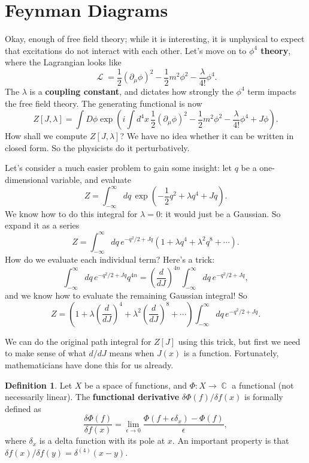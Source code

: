 \documentclass{report}
\theoremstyle{plain}
\theoremstyle{definition}
\newtheorem{definition}[theorem]{Definition}
\theoremstyle{remark}
\DeclareMathOperator{\bC}{\mathbb{C}}
\DeclareMathOperator{\cL}{\mathcal{L}}
\begin{document}
\section{Feynman Diagrams}

Okay, enough of free field theory; while it is interesting, it is
unphysical to expect that excitations do not interact with each other.
Let's move on to {\bf $\phi^4$ theory}, where the Lagrangian looks like
$$ \cL = \frac{1}{2} (\partial_\mu \phi)^2 - \frac{1}{2} m^2\phi^2 - \frac{\lambda}{4!} \phi^4. $$
The $\lambda$ is a {\bf coupling constant}, and dictates how strongly
the $\phi^4$ term impacts the free field theory. The generating
functional is now
$$ Z[J, \lambda] = \int D\phi \exp\left(i \int d^4x \, \frac{1}{2} (\partial_\mu \phi)^2 - \frac{1}{2}m^2\phi^2 - \frac{\lambda}{4!}\phi^4 + J\phi\right). $$
How shall we compute $Z[J, \lambda]$? We have no idea whether it can
be written in closed form. So the physicists do it perturbatively.

Let's consider a much easier problem to gain some insight: let $q$ be
a one-dimensional variable, and evaluate
$$ Z = \int_{-\infty}^\infty dq \, \exp\left(-\frac{1}{2} q^2 + \lambda q^4 + Jq\right). $$
We know how to do this integral for $\lambda = 0$: it would just be a
Gaussian. So expand it as a series
$$ Z = \int_{-\infty}^\infty dq \, e^{-q^2/2 + Jq} \left(1 + \lambda q^4 + \lambda^2 q^8 + \cdots\right). $$
How do we evaluate each individual term? Here's a trick:
$$ \int_{-\infty}^\infty dq \, e^{-q^2/2 + Jq} q^{4n} = \left(\frac{d}{dJ}\right)^{4n} \int_{-\infty}^\infty dq \, e^{-q^2/2 + Jq}, $$
and we know how to evaluate the remaining Gaussian integral! So
$$ Z = \left(1 + \lambda \left(\frac{d}{dJ}\right)^4 + \lambda^2 \left(\frac{d}{dJ}\right)^8 + \cdots\right) \int_{-\infty}^\infty dq \, e^{-q^2/2 + Jq}. $$

We can do the original path integral for $Z[J]$ using this trick, but
first we need to make sense of what $d/dJ$ means when $J(x)$ is a
function. Fortunately, mathematicians have done this for us already.

\begin{definition}
  Let $X$ be a space of functions, and $\Phi: X \to \bC$ a functional
  (not necessarily linear). The {\bf functional derivative}
  $\delta \Phi(f)/\delta f(x)$ is formally defined as
  $$ \frac{\delta\Phi(f)}{\delta f(x)} = \lim_{\epsilon \to 0} \frac{\Phi(f + \epsilon \delta_x) - \Phi(f)}{\epsilon}, $$
  where $\delta_x$ is a delta function with its pole at $x$. An
  important property is that
  $\delta f(x)/\delta f(y) = \delta^{(4)}(x - y)$.
\end{definition}
\end{document}
